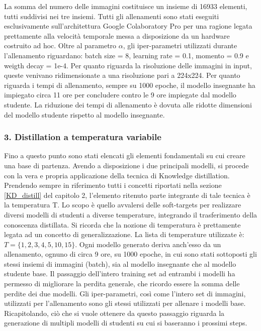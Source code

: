 La somma del numero delle immagini costituisce un insieme di 16933 elementi, tutti suddivisi nei tre insiemi. Tutti gli allenamenti sono stati eseguiti esclusivamente sull'architettura Google Colaboratory Pro per una ragione legata prettamente alla velocità temporale messa a disposizione da un hardware costruito ad hoc. Oltre al parametro $\alpha$, gli iper-parametri utilizzati durante l'allenamento riguardano: batch size = 8, learning rate = 0.1, momento = 0.9 e weigth decay = 1e-4. Per quanto riguarda la risoluzione delle immagini in input, queste venivano ridimensionate a una risoluzione pari a 224x224. Per quanto riguarda i tempi di allenamento, sempre su 1000 epoche, il modello insegnante ha impiegato circa 11 ore per concludere contro le 9 ore impiegate dal modello studente. La riduzione dei tempi di allenamento è dovuta alle ridotte dimensioni del modello studente rispetto al modello insegnante. 

\subsubsection{3. Distillation a temperatura variabile}
Fino a questo punto sono stati elencati gli elementi fondamentali su cui creare una base di partenza. Avendo a disposizione i due principali modelli, si procede con la vera e propria applicazione della tecnica di Knowledge distillation. Prendendo sempre in riferimento tutti i concetti riportati nella sezione \ref{KD_distill} del capitolo 2, l'elemento ritenuto parte integrante di tale tecnica è la temperatura T. Lo scopo è quello avvalersi delle soft-targets per realizzare diversi modelli di studenti a diverse temperature, integrando il trasferimento della conoscenza distillata. 
Si ricorda che la nozione di temperatura è prettamente legata ad un concetto di generalizzazione. La lista di temperature utilizzate è: $T=\{1, 2, 3, 4, 5, 10, 15\}$.
Ogni modello generato deriva anch'esso da un allenamento, ognuno di circa 9 ore, su 1000 epoche, in cui sono stati sottoposti gli stessi insiemi di immagini (batch), sia al modello insegnante che al modello studente base. Il passaggio dell'intero training set ad entrambi i modelli ha permesso di migliorare la perdita generale, che ricordo essere la somma delle perdite dei due modelli. Gli iper-parametri, così come l'intero set di immagini, utilizzati per l'allenamento sono gli stessi utilizzati per allenare i modelli base. Ricapitolando, ciò che si vuole ottenere da questo passaggio riguarda la generazione di multipli modelli di studenti su cui si baseranno i prossimi steps. 

